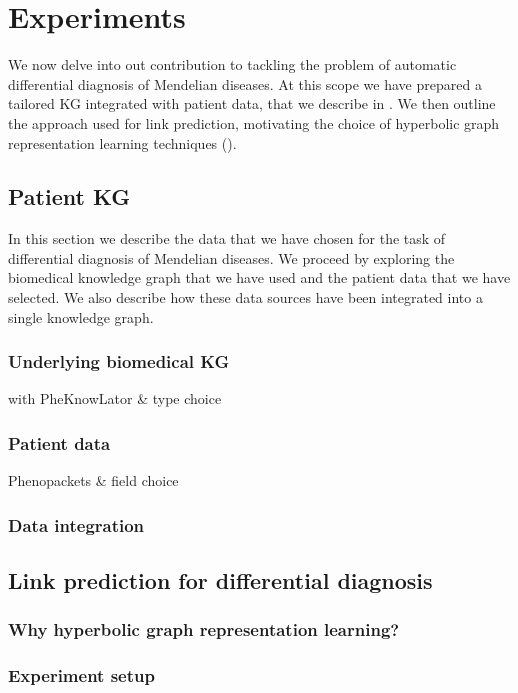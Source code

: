 \chapter{Experiments}
We now delve into out contribution to tackling the problem of automatic differential diagnosis of Mendelian diseases. At this scope we have prepared a tailored KG integrated with patient data, that we describe in . We then outline the approach used for link prediction, motivating the choice of hyperbolic graph representation learning techniques (). 

\section{Patient KG}\label{sec:patientKG}
In this section we describe the data that we have chosen for the task of differential diagnosis of Mendelian diseases. We proceed by exploring the biomedical knowledge graph that we have used and the patient data that we have selected. We also describe how these data sources have been integrated into a single knowledge graph.

\subsection{Underlying biomedical KG}
with PheKnowLator \& type choice

\subsection{Patient data}
Phenopackets \& field choice

\subsection{Data integration}

\section{Link prediction for differential diagnosis}\label{sec:linkPredictionDiffDiagnosis}

\subsection{Why hyperbolic graph representation learning?}

\subsection{Experiment setup}
